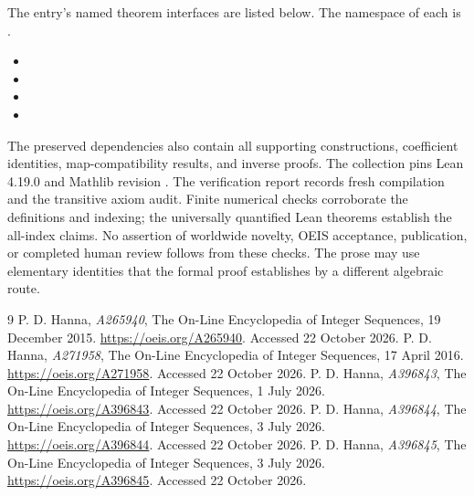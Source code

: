 \documentclass[11pt,a4paper]{article}
\theoremstyle{remark}\newtheorem{remark}[theorem]{Remark}
\begin{document}
The entry's named theorem interfaces are listed below. The namespace of
each is .
\begin{itemize}[leftmargin=1.5em,itemsep=1pt]
\item {}
\item {}
\item {}
\item {}
\end{itemize}
The preserved dependencies also contain all supporting constructions,
coefficient identities, map-compatibility results, and inverse proofs.
The collection pins Lean 4.19.0 and Mathlib revision
.
The verification report records fresh compilation and the transitive axiom
audit. Finite numerical checks corroborate the definitions and indexing;
the universally quantified Lean theorems establish the all-index claims.
No assertion of worldwide novelty, OEIS acceptance, publication, or completed
human review follows from these checks. The prose may use elementary
identities that the formal proof establishes by a different algebraic route.
\begin{thebibliography}{9}\setlength{\itemsep}{2pt}\setlength{\parsep}{0pt}
 P. D. Hanna, \emph{A265940}, The On-Line Encyclopedia of
Integer Sequences, 19 December 2015. \url{https://oeis.org/A265940}.
Accessed 22 October 2026.
 P. D. Hanna, \emph{A271958}, The On-Line Encyclopedia of
Integer Sequences, 17 April 2016. \url{https://oeis.org/A271958}.
Accessed 22 October 2026.
 P. D. Hanna, \emph{A396843}, The On-Line Encyclopedia of
Integer Sequences, 1 July 2026. \url{https://oeis.org/A396843}.
Accessed 22 October 2026.
 P. D. Hanna, \emph{A396844}, The On-Line Encyclopedia of
Integer Sequences, 3 July 2026. \url{https://oeis.org/A396844}.
Accessed 22 October 2026.
 P. D. Hanna, \emph{A396845}, The On-Line Encyclopedia of
Integer Sequences, 3 July 2026. \url{https://oeis.org/A396845}.
Accessed 22 October 2026.
\end{thebibliography}
\end{document}
